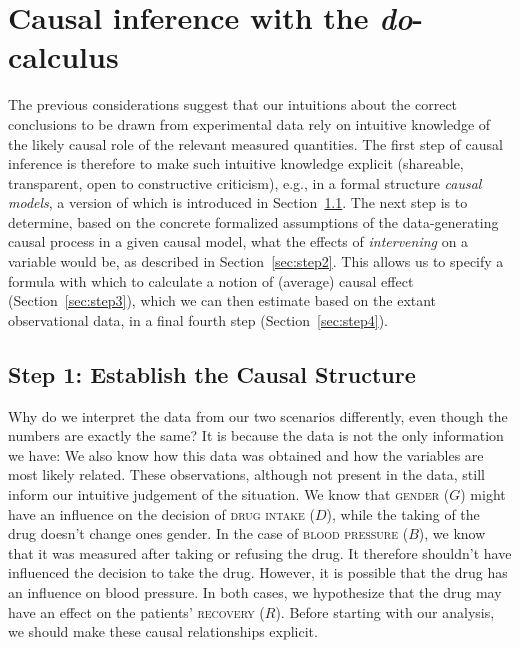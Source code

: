 \documentclass[nobib]{tufte-handout}
\newcommand{\docalc}{\emph{do}-calculus\xspace}
\begin{document}
\section{Causal inference with the \docalc} \label{sec:theory}

The previous considerations suggest that our intuitions about the correct conclusions to be drawn from experimental data rely on intuitive knowledge of the likely causal role of the relevant measured quantities.
The first step of causal inference is therefore to make such intuitive knowledge explicit (shareable, transparent, open to constructive criticism), e.g., in a formal structure \textit{causal models}, a version of which is introduced in Section~\ref{sec:step1}.
The next step is to determine, based on the concrete formalized assumptions of the data-generating causal process in a given causal model, what the effects of \textit{intervening} on a variable would be, as described in Section~\ref{sec:step2}.
This allows us to specify a formula with which to calculate a notion of (average) causal effect (Section~\ref{sec:step3}), which we can then estimate based on the extant observational data, in a final fourth step (Section~\ref{sec:step4}).



\subsection{Step 1: Establish the Causal Structure} \label{sec:step1}


Why do we interpret the data from our two scenarios differently, even though the numbers are exactly the same?
It is because the data is not the only information we have: We also know how this data was obtained and how the variables are most likely related. 
These observations, although not present in the data, still inform our intuitive judgement of the situation.
We know that \textsc{gender} ($G$) might have an influence on the decision of \textsc{drug intake} ($D$), while the taking of the drug doesn't change ones gender.
In the case of \textsc{blood pressure} ($B$), we know that it was measured after taking or refusing the drug.
It therefore shouldn't have influenced the decision to take the drug.
However, it is possible that the drug has an influence on blood pressure.
In both cases, we hypothesize that the drug may have an effect on the patients' \textsc{recovery} ($R$).
Before starting with our analysis, we should make these causal relationships explicit.
\end{document}
